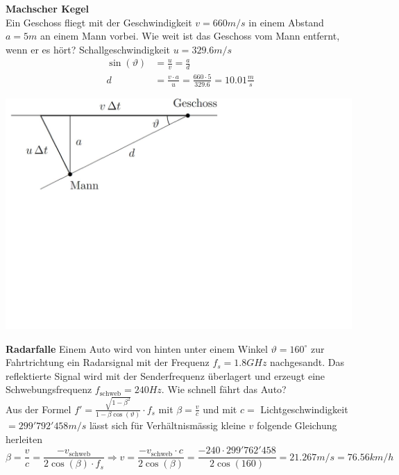\begin{minipage}{0.59\textwidth}
\textbf{Machscher Kegel}\\
Ein Geschoss fliegt mit der Geschwindigkeit $v = 660 m/s$ in einem Abstand $a=5m$ an einem Mann vorbei. Wie weit ist das Geschoss vom Mann entfernt, wenn er es hört? Schallgeschwindigkeit $u = 329.6m/s$
\begin{align*}
\sin(\vartheta) &= \frac{u}{v} = \frac{a}{d}\\
d&=\frac{v\cdot a}{u} = \frac{660\cdot 5}{329.6} = 10.01\frac{m}{s}
\end{align*}
\end{minipage}
\begin{minipage}{0.4\textwidth}
\includegraphics[width = 0.99\textwidth]{bilder/a113.png}
\end{minipage}

\textbf{Radarfalle}
Einem Auto wird von hinten unter einem Winkel $\vartheta = 160^\circ$ zur Fahrtrichtung ein Radarsignal mit der Frequenz $f_s = 1.8 GHz$ nachgesandt. Das reflektierte Signal wird mit der Senderfrequenz
 überlagert und erzeugt eine Schwebungsfrequenz $f_{\textrm{schweb}}  = 240 Hz$. Wie schnell fährt das Auto?\\

Aus der Formel $f' = \frac{\sqrt{1-\beta^2}}{1-\beta \cos(\vartheta)}\cdot f_s$ mit $\beta = \frac{v}{c}$ und mit $c= $ Lichtgeschwindigkeit $= 299'792'458 m/s$ lässt sich für Verhältnismässig kleine $v$ folgende Gleichung herleiten
\[
	\beta =\frac{v}{c} = \frac{-v_{\textrm{schweb}}}{2\cos(\beta)\cdot f_s} \Rightarrow v= \frac{-v_{\textrm{schweb}}\cdot c}{2\cos(\beta)} = \frac{-240\cdot 299'762'458}{2\cos(160)} = 21.267m/s = 76.56km/h
\]

